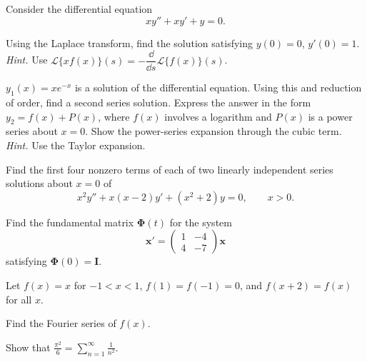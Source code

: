 \documentclass[11pt,oneside]{article}
\begin{document}
\begin{problem}
Consider the differential equation
\[xy''+xy'+y=0.\]
\begin{problemsubparts}
\item Using the Laplace transform, find the solution satisfying $y(0)=0$, $y'(0)=1$. \textit{Hint.} Use $\mathcal L\{xf(x)\}(s)=-\dfrac{\dd}{\dd s}\mathcal L\{f(x)\}(s)$.
\item $y_1(x)=xe^{-x}$ is a solution of the differential equation. Using this and reduction of order, find a second series solution. Express the answer in the form $y_2=f(x)+P(x)$, where $f(x)$ involves a logarithm and $P(x)$ is a power series about $x=0$. Show the power-series expansion through the cubic term. \textit{Hint.} Use the Taylor expansion.
\end{problemsubparts}
\end{problem}

\begin{problem}
Find the first four nonzero terms of each of two linearly independent series solutions about $x=0$ of
\[x^2y''+x(x-2)y'+(x^2+2)y=0,\qquad x>0.\]
\end{problem}

\begin{problem}
Find the fundamental matrix $\boldsymbol\Phi(t)$ for the system
\[\mathbf x'=\begin{pmatrix}1&-4\\4&-7\end{pmatrix}\mathbf x\]
satisfying $\boldsymbol\Phi(0)=\mathbf I$.
\end{problem}

\begin{problem}
Let $f(x)=x$ for $-1<x<1$, $f(1)=f(-1)=0$, and $f(x+2)=f(x)$ for all $x$.
\begin{problemsubparts}
\item Find the Fourier series of $f(x)$.
\item Show that $\displaystyle\frac{\pi^2}{6}=\sum_{n=1}^{\infty}\frac1{n^2}$.
\end{problemsubparts}
\end{problem}
\end{document}
